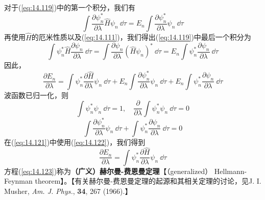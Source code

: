     对于(\ref{eq:14.119})中的第一个积分，我们有
    \begin{equation}
        \int \frac{\partial \psi_n^*}{\partial \lambda} \hat{H} \psi_n \:\dd \tau = E_n \int \frac{\partial \psi_n^*}{\partial \lambda} \psi_n \:\dd \tau
        \label{eq:14.120}
    \end{equation}
    再使用$\hat{H}$的厄米性质以及(\ref{eq:14.111})，我们得出(\ref{eq:14.119})中最后一个积分为
    \begin{equation*}
        \int \psi_n^* \hat{H} \frac{\partial \psi_n}{\partial \lambda} \:\dd \tau = \int \frac{\partial \psi_n}{\partial \lambda} \left(\hat{H} \psi_n\right)^* \:\dd \tau = E_n \int \psi_n^* \frac{\partial \psi_n}{\partial \lambda} \:\dd \tau
    \end{equation*}
    因此，
    \begin{equation}
        \frac{\partial E_n}{\partial \lambda} = \int \psi_n^* \frac{\partial \hat{H}}{\partial \lambda} \psi_n \:\dd \tau + E_n \int \frac{\partial \psi_n^*}{\partial \lambda} \psi_n \:\dd \tau + E_n \int \psi_n^* \frac{\partial \psi_n}{\partial \lambda} \:\dd \tau
        \label{eq:14.121}
    \end{equation}
    波函数已归一化，则
    \begin{equation*}
        \int \psi_n^* \psi_n \:\dd \tau = 1, \quad \frac{\partial}{\partial \lambda} \int \psi_n^* \psi_n \:\dd \tau = 0
    \end{equation*}
    \begin{equation}
        \int \frac{\partial \psi_n^*}{\partial \lambda} \psi_n \:\dd \tau + \int \psi_n^* \frac{\partial \psi_n}{\partial \lambda} \:\dd \tau = 0
        \label{eq:14.122}
    \end{equation}
    在(\ref{eq:14.121})中使用(\ref{eq:14.122})，我们得到
    \begin{equation}
        \boxed{
            \frac{\partial E_n}{\partial \lambda} = \int \psi_n^* \frac{\partial \hat{H}}{\partial \lambda} \psi_n \:\dd \tau
        }
        \label{eq:14.123}
    \end{equation}
    方程(\ref{eq:14.123})称为\textbf{（广义）赫尔曼-费恩曼定理}【（generalized） Hellmann-Feynman theorem】。【有关赫尔曼-费恩曼定理的起源和其相关定理的讨论，见J. I. Musher, \textit{Am. J. Phys.}, \textbf{34}, 267 (1966).】


